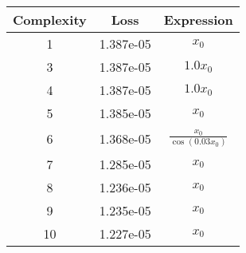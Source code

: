 \begin{center}
        \begin{tabular}{|c|c|c|}
        \hline
        Complexity & Loss & Expression \\
        \hline
        1 & 1.387e-05 & $\begin{aligned}x_{0}\end{aligned}$\\ \hline3 & 1.387e-05 & $\begin{aligned}1.0 x_{0}\end{aligned}$\\ \hline4 & 1.387e-05 & $\begin{aligned}1.0 x_{0}\end{aligned}$\\ \hline5 & 1.385e-05 & $\begin{aligned}x_{0}\end{aligned}$\\ \hline6 & 1.368e-05 & $\begin{aligned}\frac{x_{0}}{\cos{\left(0.03 x_{0} \right)}}\end{aligned}$\\ \hline7 & 1.285e-05 & $\begin{aligned}x_{0}\end{aligned}$\\ \hline8 & 1.236e-05 & $\begin{aligned}x_{0}\end{aligned}$\\ \hline9 & 1.235e-05 & $\begin{aligned}x_{0}\end{aligned}$\\ \hline10 & 1.227e-05 & $\begin{aligned}x_{0}\end{aligned}$\\ \hline\end{tabular}
        \end{center}
        